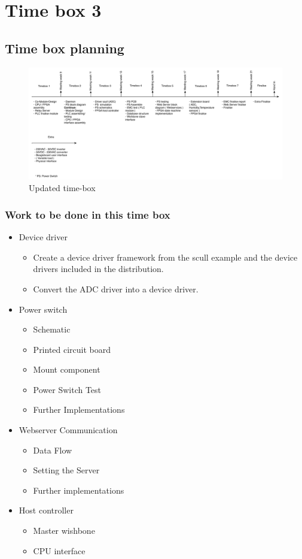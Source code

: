 \section{Time box 3}
\subsection{Time box planning}

\begin{figure}[H]
	\begin{centering}
		 \includegraphics[width=1.0\textwidth]{content/appendix/eudp/images/tb_r3.pdf}
		\caption{Updated time-box}
	\end{centering}
\end{figure}

\subsubsection{Work to be done in this time box}
\begin{itemize}
	\item Device driver
	\begin{itemize}
		\item Create a device driver framework from the scull example and the device drivers included in the distribution. 
		\item Convert the ADC driver into a device driver.
	\end{itemize}
	\item Power switch
	\begin{itemize}
		\item Schematic
		\item Printed circuit board
		\item Mount component
		\item Power Switch Test
		\item Further Implementations
	\end{itemize}
	\item{Webserver Communication}
	\begin{itemize}
		\item Data Flow
		\item Setting the Server
		\item Further implementations
	\end{itemize}
	\item Host controller
	\begin{itemize}
		\item Master wishbone
		\item CPU interface
	\end{itemize}
\end{itemize}
